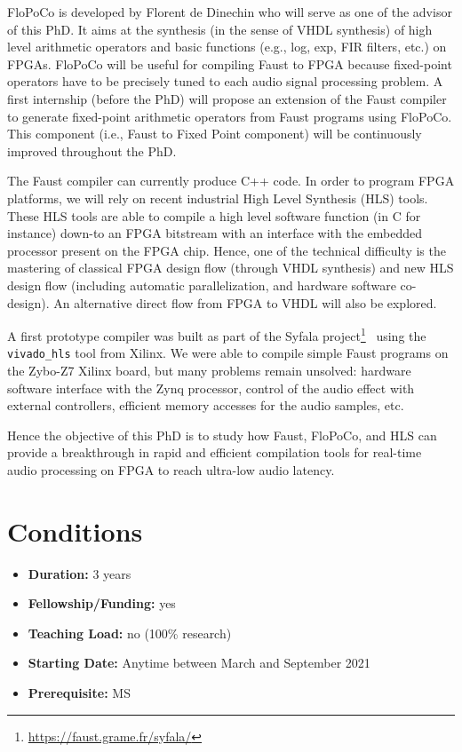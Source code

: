 \documentclass[a4paper,francais,11]{article}
\begin{document}
FloPoCo is developed by Florent de Dinechin who will serve as one of the advisor of this PhD. It aims at the synthesis (in the sense of VHDL synthesis) of high level arithmetic operators and basic functions (e.g., log, exp, FIR filters, etc.) on FPGAs. FloPoCo will be useful for compiling Faust to FPGA because fixed-point operators have to be precisely tuned to each audio signal processing problem. A first internship (before the PhD) will propose an extension of the Faust compiler to generate fixed-point arithmetic operators from Faust programs using FloPoCo. This component (i.e., Faust to Fixed Point component) will be continuously improved throughout the PhD.  

The Faust compiler can currently produce C++ code. In order to program FPGA platforms, we will rely on recent industrial High Level Synthesis (HLS) tools. These HLS tools are able to compile a high level software function (in C for instance) down-to an FPGA bitstream with an interface with the embedded processor present on the FPGA chip. Hence, one of the technical difficulty is the mastering of classical FPGA design flow (through VHDL synthesis) and new HLS design flow (including automatic parallelization, and hardware software co-design). An alternative direct flow from FPGA to VHDL will also be explored. 

A first prototype compiler was built as part of the Syfala project\footnote{\url{https://faust.grame.fr/syfala/}}~\cite{risset2020} using the {\tt vivado\_hls} tool from Xilinx. We were able to compile simple Faust programs on the Zybo-Z7 Xilinx board, but many problems remain unsolved: hardware software interface with the Zynq processor, control of the audio effect with external controllers, efficient memory accesses for the audio samples, etc. 

Hence the objective of this PhD is to study how Faust, FloPoCo, and HLS can provide a breakthrough in rapid and efficient compilation tools for real-time audio processing on FPGA to reach ultra-low audio latency.


\section*{Conditions}

\begin{itemize}
  \item \textbf{Duration:} 3 years
  \item \textbf{Fellowship/Funding:} yes
  \item \textbf{Teaching Load:} no (100\% research)
  \item \textbf{Starting Date:} Anytime between March and September 2021
  \item \textbf{Prerequisite:} MS
\end{itemize}
\end{document}
